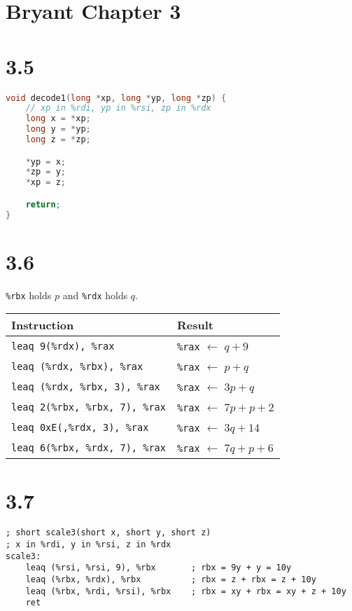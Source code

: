 \documentclass{article}
\begin{document}
\section*{Bryant Chapter 3}

\section*{3.5}

\begin{lstlisting}[language=C]
void decode1(long *xp, long *yp, long *zp) {
    // xp in %rdi, yp in %rsi, zp in %rdx
    long x = *xp;
    long y = *yp;
    long z = *zp;

    *yp = x;
    *zp = y;
    *xp = z;

    return;
}
\end{lstlisting}

\section*{3.6}

\texttt{\%rbx} holds $p$ and \texttt{\%rdx} holds $q$.

\vspace{1em}    

\noindent \begin{tabular}{|l|l|}
    \hline
    \textbf{Instruction} & \textbf{Result} \\
    \hline
    \texttt{leaq 9(\%rdx), \%rax} & \texttt{\%rax} $\leftarrow \; q + 9$ \\
    \texttt{leaq (\%rdx, \%rbx), \%rax} & \texttt{\%rax} $\leftarrow \; p + q$ \\
    \texttt{leaq (\%rdx, \%rbx, 3), \%rax} & \texttt{\%rax} $\leftarrow \; 3p + q$ \\
    \texttt{leaq 2(\%rbx, \%rbx, 7), \%rax} & \texttt{\%rax} $\leftarrow \; 7p + p + 2$ \\
    \texttt{leaq 0xE(,\%rdx, 3), \%rax} & \texttt{\%rax} $\leftarrow \; 3q + 14$ \\
    \texttt{leaq 6(\%rbx, \%rdx, 7), \%rax} & \texttt{\%rax} $\leftarrow \; 7q + p + 6$ \\
    \hline
\end{tabular}

\section*{3.7}

\begin{lstlisting}[language=myassembly]
; short scale3(short x, short y, short z)
; x in %rdi, y in %rsi, z in %rdx
scale3:
    leaq (%rsi, %rsi, 9), %rbx       ; rbx = 9y + y = 10y
    leaq (%rbx, %rdx), %rbx          ; rbx = z + rbx = z + 10y
    leaq (%rbx, %rdi, %rsi), %rbx    ; rbx = xy + rbx = xy + z + 10y
    ret
\end{lstlisting}
\end{document}
